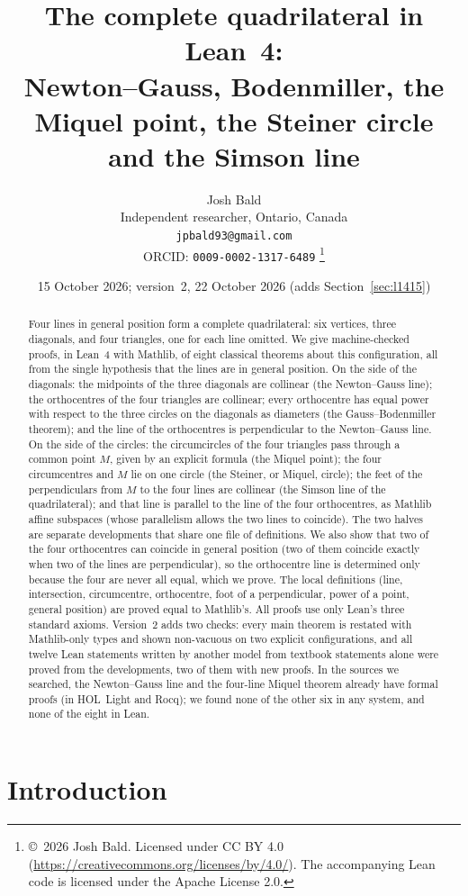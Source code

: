 \documentclass[11pt]{article}
\title{The complete quadrilateral in Lean~4:\\
Newton--Gauss, Bodenmiller, the Miquel point, the Steiner circle and the Simson line}
\author{Josh Bald\\ \small Independent researcher, Ontario, Canada\\ \small\texttt{jpbald93@gmail.com}\\
\small ORCID: \texttt{0009-0002-1317-6489}
\thanks{\copyright~2026 Josh Bald. Licensed under CC BY 4.0 (\url{https://creativecommons.org/licenses/by/4.0/}). The accompanying Lean code is licensed under the Apache License 2.0.}}
\date{15 October 2026; version~2, 22 October 2026 (adds Section~\ref{sec:l1415})}
\theoremstyle{definition}
\theoremstyle{remark}
\begin{document}
\sloppy
\maketitle

\begin{abstract}
Four lines in general position form a complete quadrilateral: six vertices, three diagonals, and
four triangles, one for each line omitted. We give machine-checked proofs, in Lean~4 with Mathlib,
of eight classical theorems about this configuration, all from the single hypothesis that the lines
are in general position. On the side of the diagonals: the midpoints of the three diagonals are
collinear (the Newton--Gauss line); the orthocentres of the four triangles are collinear; every
orthocentre has equal power with respect to the three circles on the diagonals as diameters (the
Gauss--Bodenmiller theorem); and the line of the orthocentres is perpendicular to the Newton--Gauss
line. On the side of the circles: the circumcircles of the four triangles pass through a common point
$M$, given by an explicit formula (the Miquel point); the four circumcentres and $M$ lie on one circle
(the Steiner, or Miquel, circle); the feet of the perpendiculars from $M$ to the four lines are
collinear (the Simson line of the quadrilateral); and that line is parallel to the line of the four
orthocentres, as Mathlib affine subspaces (whose parallelism allows the two lines to coincide). The two halves are separate developments that share one file of definitions. We also
show that two of the four orthocentres can coincide in general position (two of them coincide exactly
when two of the lines are perpendicular), so the orthocentre line is determined only because the four
are never all equal, which we prove. The local definitions (line, intersection, circumcentre,
orthocentre, foot of a perpendicular, power of a point, general position) are proved equal to
Mathlib's. All proofs use only Lean's
three standard axioms. Version~2 adds two checks: every main theorem is restated with Mathlib-only
types and shown non-vacuous on two explicit configurations, and all twelve Lean statements written by
another model from textbook statements alone were proved from the developments, two of them with
new proofs. In the sources we searched, the Newton--Gauss line and the four-line Miquel
theorem already have formal proofs (in HOL~Light and Rocq); we found none of the other six in any
system, and none of the eight in Lean.
\end{abstract}

\section{Introduction}
\end{document}
